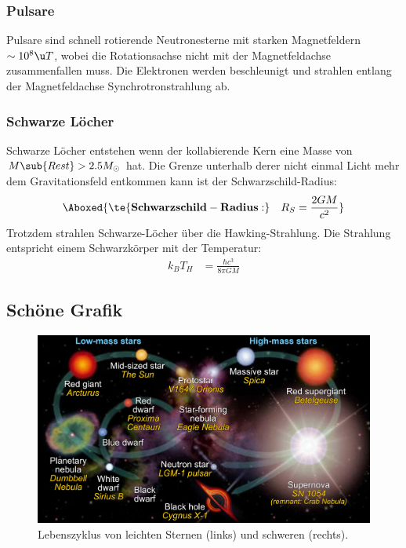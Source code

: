 \documentclass[final]{summery_5.0}
\begin{document}
\subsubsection{Pulsare}
Pulsare sind schnell rotierende Neutronesterne mit starken Magnetfeldern $\sim10^8 \u T$, wobei die Rotationsachse nicht mit der Magnetfeldachse zusammenfallen muss. Die Elektronen werden beschleunigt und strahlen entlang der Magnetfeldachse Synchrotronstrahlung ab. 

\subsubsection{Schwarze Löcher}
Schwarze Löcher entstehen wenn der kollabierende Kern eine Masse von $M\sub{Rest}>2.5M_{\odot}$ hat. Die Grenze unterhalb derer nicht einmal Licht mehr dem Gravitationsfeld entkommen kann ist der Schwarzschild-Radius:
\begin{align*}
    \Aboxed{\te{\bf Schwarzschild-Radius:}\quad  R_S = \frac{2GM}{c^2}}
\end{align*}
Trotzdem strahlen Schwarze-Löcher über die Hawking-Strahlung. Die Strahlung entspricht einem Schwarzkörper mit der Temperatur:
\begin{align*}
        k_B T_H &=  \frac{\hbar c^3}{8\pi G M}
\end{align*}

\subsection{Schöne Grafik}
\begin{figure}[H]
    \centering    
    \includegraphics[width=1.0\textwidth]{Star_life_cycles.jpg}
    \caption{Lebenszyklus von leichten Sternen (links) und schweren (rechts).}
    \label{fig:Star_life_cycles}
\end{figure}
\end{document}
